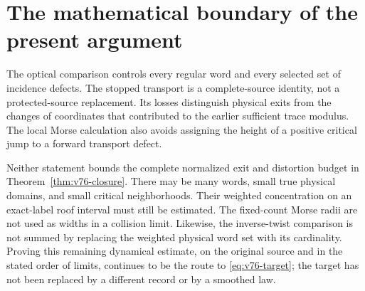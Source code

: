 \documentclass[11pt,reqno]{amsart}
\numberwithin{equation}{section}
\theoremstyle{definition}
\theoremstyle{remark}\newtheorem{remark}[theorem]{Remark}
\begin{document}




\section{The mathematical boundary of the present argument}
The optical comparison controls every regular word and every selected
set of incidence defects. The stopped transport is a complete-source
identity, not a protected-source replacement. Its losses distinguish
physical exits from the changes of coordinates that contributed to
the earlier sufficient trace modulus. The local Morse calculation
also avoids assigning the height of a positive critical jump to a
forward transport defect.

Neither statement bounds the complete normalized exit and distortion
budget in Theorem~\ref{thm:v76-closure}. There may be many words,
small true physical domains, and small critical neighborhoods. Their
weighted concentration on an exact-label roof interval must still be
estimated. The fixed-count Morse radii are not used as widths in a
collision limit. Likewise, the inverse-twist comparison is not summed
by replacing the weighted physical word set with its cardinality.
Proving this remaining dynamical estimate, on the original source
and in the stated order of limits, continues to be the route to
\eqref{eq:v76-target}; the target has not been replaced by a different
record or by a smoothed law.


\end{document}
